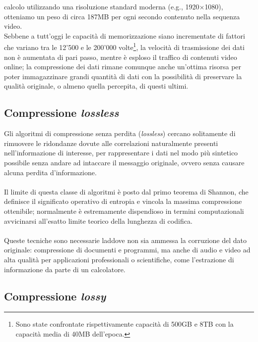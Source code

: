 calcolo utilizzando una risoluzione standard moderna (e.g., 1920$\times$1080), 
otteniamo un peso di circa 187MB per ogni secondo contenuto nella sequenza 
video. \\
Sebbene a tutt'oggi le capacità di memorizzazione siano incrementate di fattori
che variano tra le 12'500 e le 200'000 volte\footnote{Sono state confrontate
rispettivamente capacità di 500GB e 8TB con la capacità media di 40MB 
dell'epoca.}, la velocità di trasmissione dei dati non è aumentata di pari 
passo, mentre è esploso il traffico di contenuti video online; la compressione 
dei dati rimane comunque anche un'ottima risorsa per
poter immagazzinare grandi quantità di dati con la possibilità di preservare
la qualità originale, o almeno quella percepita, di questi ultimi.
\subsection{Compressione \emph{lossless}}

Gli algoritmi di compressione senza perdita (\emph{lossless}) cercano 
solitamente di rimuovere le ridondanze dovute alle correlazioni naturalmente 
presenti nell'informazione di interesse, per rappresentare i
dati nel modo più sintetico possibile senza andare ad intaccare il messaggio
originale, ovvero senza causare alcuna perdita d'informazione.
\\ \\ %
Il limite di questa classe di algoritmi è posto dal primo teorema di 
Shannon, che definisce il significato operativo di entropia e vincola la 
massima compressione ottenibile; normalmente è estremamente 
dispendioso in termini computazionali avvicinarsi all'esatto limite teorico 
della lunghezza di codifica. %
\\ \\
Queste tecniche sono necessarie laddove non sia ammessa la corruzione del dato 
originale: compressione di documenti e programmi, ma anche di audio e video ad 
alta qualità per applicazioni professionali o scientifiche, come l'estrazione 
di informazione da parte di un calcolatore.


\subsection{Compressione \emph{lossy}}

